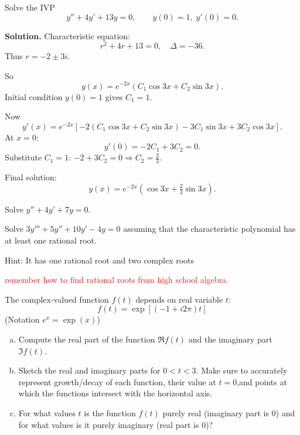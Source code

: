   \begin{example}
    Solve the IVP
    \[
    y'' + 4y' + 13y = 0, \qquad y(0)=1,\; y'(0)=0.
    \]

    \textbf{Solution.} Characteristic equation:
    \[
    r^2 + 4r + 13 = 0, \quad \Delta = -36.
    \]
    Thus $r = -2 \pm 3i$.  

    So
    \[
    y(x) = e^{-2x}\left(C_1\cos 3x + C_2\sin 3x\right).
    \]
    Initial condition $y(0)=1$ gives $C_1=1$.  

    Now
    \[
    y'(x) = e^{-2x}\left[-2(C_1\cos 3x + C_2\sin 3x) -3C_1\sin 3x + 3C_2\cos 3x\right].
    \]
    At $x=0$:
    \[
    y'(0)=-2C_1+3C_2=0.
    \]
    Substitute $C_1=1$: $-2+3C_2=0 \Rightarrow C_2=\tfrac{2}{3}$.  

    Final solution:
    \[
    y(x) = e^{-2x}\left(\cos 3x + \tfrac{2}{3}\sin 3x\right).
    \]
    \end{example}


  \begin{example}
    Solve \(y'' + 4y' + 7y = 0\).
  \end{example}


  \begin{example}
    Solve \(3y''' + 5y'' + 10y' - 4y = 0\) assuming that the characteristic polynomial has at least one rational root.

    \textcolor{blue!60}{Hint: It has one rational root and two complex roots}

    \textcolor{red}{remember how to find rational roots from high school algebra.}
  \end{example}


  \begin{example}
    The complex-valued function  \(f(t)\) depends on real variable \(t\):
    \[
    f(t) =    \exp\left[(-1+i2\pi)t\right]
    \]
    (Notation \(e^{x} = \exp(x)\))
    \begin{enumerate}[(a)]
      \item Compute the real part of the function \(\Re f(t)\) and the imaginary part \(\Im f(t)\). \solspace{.25in}
      \item Sketch the real and imaginary parts for \(0 < t < 3\). Make sure to accurately represent growth/decay of each 
            function, their value at \(t=0\),and points at which the functions intersect with the horizontal axis.
      \item For what values \(t\) is the function \(f(t)\) purely real (imaginary part is 0) and for what values is it purely
            imaginary (real part is \(0\))?
      \vspace{1em}
    \end{enumerate}
     \quad {}
  \end{example}


